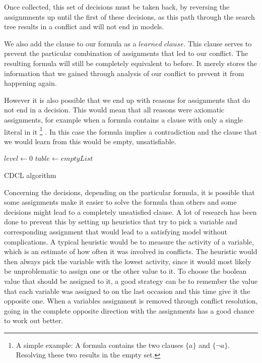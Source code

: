 Once collected, this set of decisions must be taken back, by reversing the assignmnents up until the first of these decisions, as this path through the search tree results in a conflict and will not end in models. 

We also add the clause to our formula as a $learned\; clause$. This clause serves to prevent the particular combination of assignments that led to our conflict. The resulting formula will still be completely equivalent to before. It merely stores the information that we gained through analysis of our conflict to prevent it from happening again.

However it is also possible that we end up with reasons for assignments that do not end in a decision. This would mean that all reasons were axiomatic assignments, for example when a formula contains a clause with only a single literal in it \footnote{A simple example: A formula contains the two clauses $\{a\}$ and $\{\neg a\}$. Resolving these two results in the empty set.}  .
In this case the formula implies a contradiction and the clause that we would learn from this would be empty, unsatisfiable.


\begin{algorithm}
\DontPrintSemicolon
{}
$level \gets 0$\;
$table \gets emptyList$\;
\caption{{\sc CDCL algorithm}}
\end{algorithm}


Concerning the decisions, depending on the particular formula, it is possible that some assignments make it easier to solve the formula than others and some decisions might lead to a completely unsatisfied clause. A lot of research has been done to prevent this by setting up heuristics that try to pick a variable and corresponding assignment that would lead to a satisfying model without complications. A typical heuristic would be to measure the activity of a variable, which is an estimate of how often it was involved in conflicts. The heuristic would then always pick the variable with the lowest activity, since it would most likely be unproblematic to assign one or the other value to it. To choose the boolean value that should be assigned to it, a good strategy can be to remember the value that each variable was assigned to on the last occasion and this time give it the opposite one. When a variables assignment is removed through conflict resolution, going in the complete opposite direction with the assignments has a good chance to work out better.

